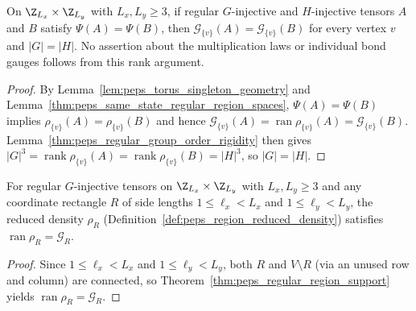 \begin{lemma}%
    \label{thm:peps_regular_torus_local_rigidity}
    \leanok
    On $\Z_{L_x}\times\Z_{L_y}$ with $L_x,L_y\ge 3$, if regular $G$-injective
    and $H$-injective tensors $A$ and $B$ satisfy $\Psi(A)=\Psi(B)$, then
    $\mathcal G_{\{v\}}(A)=\mathcal G_{\{v\}}(B)$ for every vertex $v$ and
    $|G|=|H|$. No assertion about the multiplication laws or individual bond
    gauges follows from this rank argument.
\end{lemma}

\begin{proof}\leanok
    By Lemma~\ref{lem:peps_torus_singleton_geometry} and
    Lemma~\ref{thm:peps_same_state_regular_region_spaces},
    $\Psi(A)=\Psi(B)$ implies $\rho_{\{v\}}(A)=\rho_{\{v\}}(B)$ and hence
    $\mathcal G_{\{v\}}(A)=\operatorname{ran}\rho_{\{v\}}(A)=\mathcal G_{\{v\}}(B)$.
    Lemma~\ref{thm:peps_regular_group_order_rigidity} then gives
    $|G|^3=\operatorname{rank}\rho_{\{v\}}(A)=\operatorname{rank}\rho_{\{v\}}(B)=|H|^3$,
    so $|G|=|H|$.
\end{proof}

\begin{lemma}%
    \label{thm:peps_regular_torus_rectangle_support}
    \leanok
    For regular $G$-injective tensors on $\Z_{L_x}\times\Z_{L_y}$ with
    $L_x,L_y\ge 3$ and any coordinate rectangle $R$ of side lengths
    $1\le\ell_x<L_x$ and $1\le\ell_y<L_y$, the reduced density
    $\rho_R$ (Definition~\ref{def:peps_region_reduced_density}) satisfies
    $\operatorname{ran}\rho_R=\mathcal G_R$.
\end{lemma}

\begin{proof}\leanok
    Since $1\le\ell_x<L_x$ and $1\le\ell_y<L_y$, both $R$ and $V\setminus R$
    (via an unused row and column) are connected, so
    Theorem~\ref{thm:peps_regular_region_support} yields
    $\operatorname{ran}\rho_R=\mathcal G_R$.
\end{proof}
